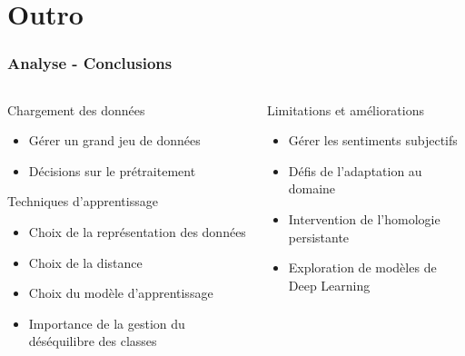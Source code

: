 \documentclass{beamer}
\begin{document}
\section{Outro}
\begin{frame}
\linespread{1}
\frametitle{Analyse - Conclusions}

\begin{columns}[t]
\begin{column}{0.55\textwidth} %
\begin{block}{Chargement des données}
\begin{itemize}
\item Gérer un grand jeu de données
\item Décisions sur le prétraitement
\end{itemize}
\end{block}

\begin{block}{Techniques d'apprentissage}
\begin{itemize}
\item Choix de la représentation des données 
\item Choix de la distance
\item Choix du modèle d'apprentissage
\item Importance de la gestion du déséquilibre des classes
\end{itemize}
\end{block}
\end{column}

\begin{column}{0.4\textwidth} %
\begin{block}{Limitations et améliorations}
\begin{itemize}
\item Gérer les sentiments subjectifs
\item Défis de l'adaptation au domaine
\item Intervention de l'homologie persistante
\item Exploration de modèles de Deep Learning
\end{itemize}
\end{block}
\end{column}
\end{columns}
\end{frame}
\end{document}
